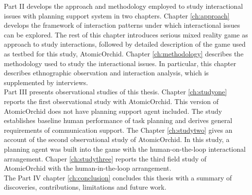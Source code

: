 Part II develops the approach and methodology employed to study interactional issues with planning support system in two chapters. Chapter \ref{ch:approach} develops the framework of interaction patterns under which interactional issues can be explored. The rest of this chapter introduces serious mixed reality game as approach to study interactions, followed by detailed description of the game used as testbed for this study, AtomicOrchid. Chapter \ref{ch:methodology} describes the methodology used to study the interactional issues. In particular, this chapter describes ethnographic observation and interaction analysis, which is supplemented by interviews. \\ 

Part III presents observational studies of this thesis. Chapter \ref{ch:studyone} reports the first observational study with AtomicOrchid. This version of AtomicOrchid does not have planning support agent included. The study establishes baseline human performance of task planning and derives general requirements of communication support. The Chapter \ref{ch:studytwo} gives an account of the second observational study of AtomicOrchid. In this study, a planning agent was built into the game with the human-on-the-loop interactional arrangement. Chaper \ref{ch:studythree} reports the third field study of AtomicOrchid with the human-in-the-loop arrangement. \\ 

The Part IV chapter \ref{ch:conclusion} concludes this thesis with a summary of discoveries, contributions, limitations and future work.\\









